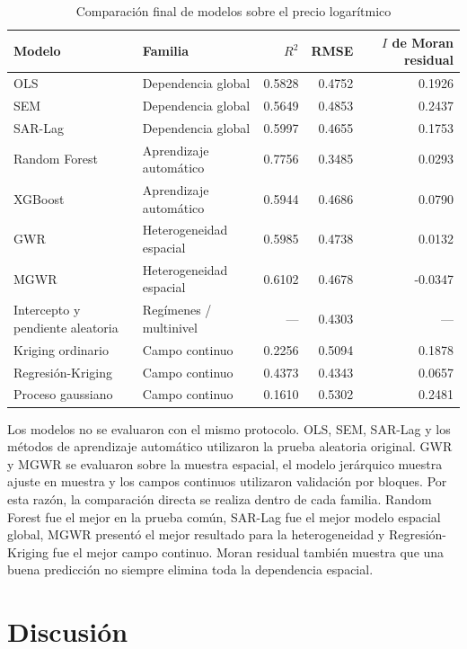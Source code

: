 \documentclass[conference]{IEEEtran}
\begin{document}
\begin{table}[!htbp]
\caption{Comparación final de modelos sobre el precio logarítmico}
\label{tab:final-comparison}
\centering
\scriptsize
\setlength{\tabcolsep}{2pt}
\begin{tabularx}{\columnwidth}{@{}XXrrr@{}}
\toprule
Modelo & Familia & $R^2$ & RMSE & $I$ de Moran residual\\
\midrule
OLS & Dependencia global & 0.5828 & 0.4752 & 0.1926\\
SEM & Dependencia global & 0.5649 & 0.4853 & 0.2437\\
SAR-Lag & Dependencia global & 0.5997 & 0.4655 & 0.1753\\
Random Forest & Aprendizaje automático & 0.7756 & 0.3485 & 0.0293\\
XGBoost & Aprendizaje automático & 0.5944 & 0.4686 & 0.0790\\
GWR & Heterogeneidad espacial & 0.5985 & 0.4738 & 0.0132\\
MGWR & Heterogeneidad espacial & 0.6102 & 0.4678 & -0.0347\\
Intercepto y pendiente aleatoria & Regímenes / multinivel & --- & 0.4303 & ---\\
Kriging ordinario & Campo continuo & 0.2256 & 0.5094 & 0.1878\\
Regresión-Kriging & Campo continuo & 0.4373 & 0.4343 & 0.0657\\
Proceso gaussiano & Campo continuo & 0.1610 & 0.5302 & 0.2481\\
\bottomrule
\end{tabularx}
\end{table}

Los modelos no se evaluaron con el mismo protocolo. OLS, SEM, SAR-Lag y los métodos de aprendizaje automático utilizaron la prueba aleatoria original. GWR y MGWR se evaluaron sobre la muestra espacial, el modelo jerárquico muestra ajuste en muestra y los campos continuos utilizaron validación por bloques. Por esta razón, la comparación directa se realiza dentro de cada familia. Random Forest fue el mejor en la prueba común, SAR-Lag fue el mejor modelo espacial global, MGWR presentó el mejor resultado para la heterogeneidad y Regresión-Kriging fue el mejor campo continuo. Moran residual también muestra que una buena predicción no siempre elimina toda la dependencia espacial.

\section{Discusión}
\end{document}
